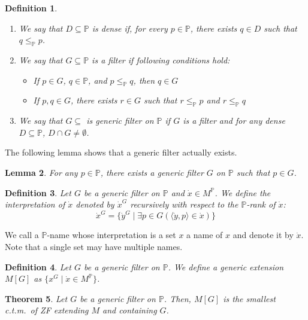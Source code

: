 \documentclass{report}
\newtheorem{thm}{Theorem}[section]
\newtheorem{lem}[thm]{Lemma}
\newtheorem{dfn}[thm]{Definition}
\begin{document}
\begin{dfn}  
  \,
  \begin{enumerate}
    \item We say that $D \subseteq \mathbb{P}$ is \emph{dense} if, for every $p \in \mathbb{P}$, there exists $q \in D$ such that $q \leq_{\mathbb{P}} p$.
    \item We say that $G \subseteq \mathbb{P}$ is a \emph{filter} if following conditions hold:
      \begin{itemize}
        \item If $p \in G$, $q \in \mathbb{P}$, and $p \leq_{\mathbb{P}} q$, then $q \in G$
        \item If $p, q \in G$, there exists $r \in G$ such that $r \leq_{\mathbb{P}} p$ and $r \leq_{\mathbb{P}} q$
      \end{itemize}
    \item We say that $G \subseteq$ is \emph{generic filter} on $\mathbb{P}$ if $G$ is a filter and for any dense $D \subseteq \mathbb{P}$, $D \cap G \neq \emptyset$.
  \end{enumerate}
\end{dfn}

The following lemma shows that a generic filter actually exists.
\begin{lem} 
  For any $p \in \mathbb{P}$, there exists a generic filter $G$ on $\mathbb{P}$ such that $p \in G$.
\end{lem}

\begin{dfn} 
  Let $G$ be a generic filter on $\mathbb{P}$ and $\dot{x} \in M^{\mathbb{P}}$. We define the \emph{interpretation} of $\dot{x}$ denoted by $\dot{x}^G$ recursively with respect to the $\mathbb{P}$-rank of $\dot{x}$:
  $$\dot{x}^G = \{\dot{y}^G \mid \exists p \in G (\langle \dot{y}, p \rangle \in \dot{x})\}$$ 
\end{dfn}

We call a $\mathbb{P}$-name whose interpretation is a set $x$ a name of $x$ and denote it by $\dot{x}$.
Note that a single set may have multiple names.

\begin{dfn} 
  Let $G$ be a generic filter on $\mathbb{P}$. We define a \emph{generic extension} $M[G]$ as $\{x^G \mid \dot{x} \in M^{\mathbb{P}}\}$.
\end{dfn}

\begin{thm} 
  Let $G$ be a generic filter on $\mathbb{P}$. Then, $M[G]$ is the smallest c.t.m.\  of ZF extending $M$ and containing $G$.
\end{thm}
\end{document}
